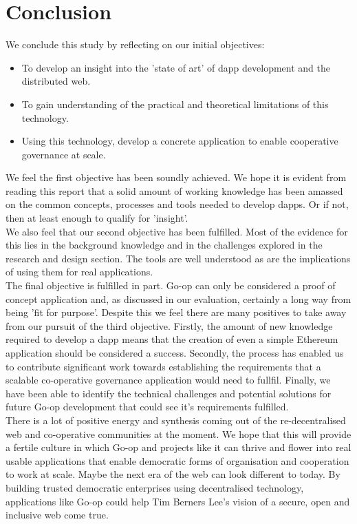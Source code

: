 
\chapter{Conclusion} %

\label{Conclusion} %
We conclude this study by reflecting on our initial objectives:
\begin{itemize}
\item To develop an insight into the 'state of art' of dapp development and the distributed web.
\item To gain understanding of the practical and theoretical limitations of this technology.
\item Using this technology, develop a concrete application to enable cooperative governance at scale. 
\end{itemize}

We feel the first objective has been soundly achieved. We hope it is evident from reading this report that a solid amount of working knowledge has been amassed on the common concepts, processes and tools needed to develop dapps. Or if not, then at least enough to qualify for 'insight'.\\

We also feel that our second objective has been fulfilled. Most of the evidence for this lies in the background knowledge and in the challenges explored in the research and design section. The tools are well understood as are the implications of using them for real applications.\\

The final objective is fulfilled in part. Go-op can only be considered a proof of concept application and, as discussed in our evaluation, certainly a long way from being 'fit for purpose'. Despite this we feel there are many positives to take away from our pursuit of the third objective. Firstly, the amount of new knowledge required to develop a dapp means that the creation of even a simple Ethereum application should be considered a success. Secondly, the process has enabled us to contribute significant work towards establishing the requirements that a scalable co-operative governance application would need to fullfil. Finally, we have been able to identify the technical challenges and potential solutions for future Go-op development that could see it's requirements fulfilled.\\

There is a lot of positive energy and synthesis coming out of the re-decentralised web and co-operative communities at the moment. We hope that this will provide a fertile culture in which Go-op and projects like it can thrive and flower into real usable applications that enable democratic forms of organisation and cooperation to work at scale. Maybe the next era of the web can look different to today. By building trusted democratic enterprises using decentralised technology, applications like Go-op could help Tim Berners Lee's vision of a secure, open and inclusive web come true.\\